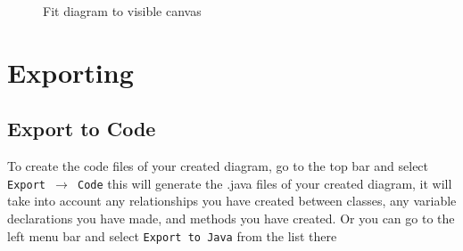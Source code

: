 \documentclass[a4paper]{article}
\begin{document}
{\begin{figure}[H]
\begin{center}
\label{fig:fitDiagram}
\caption{Fit diagram to visible canvas}
\vspace{-20pt}
\end{center} \end{figure} 
\newpage
\section{Exporting}
\subsection{Export to Code} 
To create the code files of your created diagram, go to the top bar and select \texttt{Export $\rightarrow$ Code} this will generate the .java files of your created diagram, it will take into account any relationships you have created
between classes, any variable declarations you have made, and methods you have created. Or you can go to the left menu bar and select \texttt{Export to Java} from the list there

}
\end{document}
